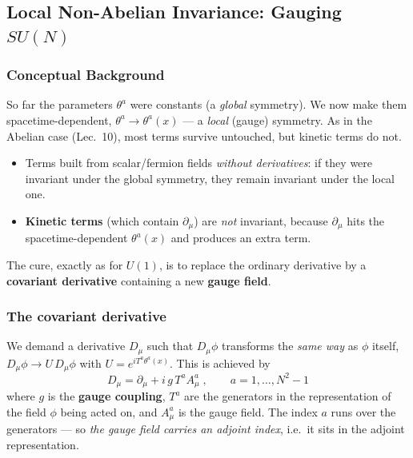 \documentclass[../main.tex]{subfiles}
\begin{document}
\subsection{Local Non-Abelian Invariance: Gauging $SU(N)$}\label{sec:lec13:gauging}

\subsubsection*{Conceptual Background}

So far the parameters $\theta^a$ were constants (a \emph{global} symmetry). We now make them spacetime-dependent, $\theta^a\to\theta^a(x)$ --- a \emph{local} (gauge) symmetry. As in the Abelian case (Lec.~10), most terms survive untouched, but kinetic terms do not.

\begin{itemize}
  \item Terms built from scalar/fermion fields \emph{without derivatives}: if they were invariant under the global symmetry, they remain invariant under the local one.
  \item \textbf{Kinetic terms} (which contain $\partial_\mu$) are \emph{not} invariant, because $\partial_\mu$ hits the spacetime-dependent $\theta^a(x)$ and produces an extra term.
\end{itemize}

The cure, exactly as for $U(1)$, is to replace the ordinary derivative by a \textbf{covariant derivative} containing a new \textbf{gauge field}.

\subsubsection*{The covariant derivative}

We demand a derivative $D_\mu$ such that $D_\mu\phi$ transforms the \emph{same way} as $\phi$ itself, $D_\mu\phi \to U\,D_\mu\phi$ with $U=e^{iT^a\theta^a(x)}$. This is achieved by
\begin{equation}
  \boxed{\;D_\mu = \partial_\mu + i\,g\,T^a A_\mu^a\;,\qquad a=1,\dots,N^2-1\;}
  \label{eq:lec13:covderiv}
\end{equation}
where $g$ is the \textbf{gauge coupling}, $T^a$ are the generators in the representation of the field $\phi$ being acted on, and $A_\mu^a$ is the gauge field. The index $a$ runs over the generators --- so \emph{the gauge field carries an adjoint index}, i.e.\ it sits in the adjoint representation.
\end{document}
